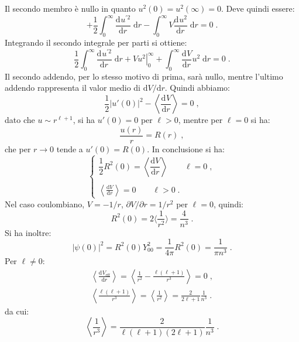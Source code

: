 \documentclass[10pt,a4paper]{report}
\theoremstyle{definition}
\newcommand{\dev}[3][]{\frac{\mathrm{d}^{#1} #2}{\mathrm{d} #3^{#1}}}
\numberwithin{equation}{section}
\newcommand{\diff}[1][]{\mathrm{d}#1}
\newcommand{\bra}{\langle}
\newcommand{\ket}{\rangle}
\begin{document}
Il secondo membro è nullo in quanto $u^2(0)=u^2(\infty)=0$. Deve quindi essere:
\begin{equation}
+\frac{1}{2}\int_0^{\infty} \dev{u^{'2}}{r}\;\diff{r}-\int_0^{\infty} V\dev{u^2}{r}\;\diff{r}=0\;.
\end{equation}
Integrando il secondo integrale per parti si ottiene:
\begin{equation}
\frac{1}{2}\int_0^{\infty} \dev{u^{'2}}{r}\;\diff{r}+\left. Vu^2\right|^{\infty}_0+\int_0^{\infty} \dev{V}{r}u^2\;\diff{r}=0\;.
\end{equation}
Il secondo addendo, per lo stesso motivo di prima, sarà nullo, mentre l'ultimo addendo rappresenta il valor medio di $\diff{V}/\diff{r}$. Quindi abbiamo:
\begin{equation}
\frac{1}{2}|u'(0)|^2-\left\langle\dev{V}{r}\right\rangle=0\;,
\end{equation}
dato che $u\sim r^{\ell+1}$, si ha $u'(0)=0$ per $\ell>0$, mentre per $\ell=0$ si ha:
\begin{equation}
\frac{u(r)}{r}=R(r)\;,
\end{equation}
che per $r\to 0$ tende a $u'(0)=R(0)$. In conclusione si ha:
\begin{equation}
\begin{cases}
\dfrac{1}{2}R^2(0)=\left\langle \dfrac{\diff{V}}{\diff{r}}\right\rangle \qquad \ell=0 \;,\\
\\
\left\langle\frac{\diff{V}}{\diff{r}}\right\rangle=0\qquad \ell>0\;.
\end{cases}
\end{equation}
Nel caso coulombiano, $V=-1/r$, $\partial V/\partial r=1/r^2$ per $\ell=0$, quindi:
\begin{equation}
R^2(0)=2\bra \frac{1}{r^2}\ket=\frac{4}{n^3}\;.
\end{equation}
Si ha inoltre:
\begin{equation}
|\psi(0)|^2=R^2(0)Y^2_{00}=\frac{1}{4\pi}R^2(0)=\frac{1}{\pi n^3}\;.
\end{equation}
Per $\ell\ne 0$:
\begin{align}
\left\langle \dev{V_{\mathrm{eff}}}{r}\right\rangle=\left\langle \frac{1}{r^2}-\frac{\ell(\ell+1)}{r^3}\right\rangle=0\;, \\
\left\langle \frac{\ell(\ell+1)}{r^3}\right\rangle=\left\langle \frac{1}{r^2}\right\rangle=\frac{2}{2\ell+1}\frac{1}{n^3}\;.
\end{align}
da cui:
\begin{equation}
\left\langle \frac{1}{r^3}\right\rangle= \frac{2}{\ell(\ell+1)(2\ell+1)}\frac{1}{n^3}\;.
\end{equation}
\end{document}
